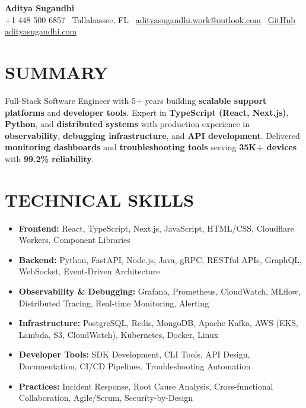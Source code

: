 \documentclass[letterpaper,10pt]{article}
\newcommand{\resumeItem}[1]{\item\small #1}
\begin{document}
\begin{center}
{\huge\textbf{Aditya Sugandhi}} \\
+1 448 500 6857 \textbar\ \textcolor{metablue}{Tallahassee, FL} \textbar\
\href{mailto:adityasugandhi.work@outlook.com}{adityasugandhi.work@outlook.com} \textbar\
\href{https://github.com/adityasugandhi}{GitHub}
\textbar \href{https://adityasugandhi.com}{adityasugandhi.com}
\end{center}
\vspace{-12pt}

\section{\textcolor{metablue}{SUMMARY}}
\small
\vspace{-6pt}
Full-Stack Software Engineer with 5+ years building \textbf{scalable support platforms} and \textbf{developer tools}. Expert in \textbf{TypeScript (React, Next.js)}, \textbf{Python}, and \textbf{distributed systems} with production experience in \textbf{observability}, \textbf{debugging infrastructure}, and \textbf{API development}. Delivered \textbf{monitoring dashboards} and \textbf{troubleshooting tools} serving \textbf{35K+ devices} with \textbf{99.2\% reliability}.

\vspace{-9pt}

\section{\textcolor{metablue}{TECHNICAL SKILLS}}
\vspace{-5pt}
\small
\begin{itemize}
\resumeItem{\textbf{Frontend:} React, TypeScript, Next.js, JavaScript, HTML/CSS, Cloudflare Workers, Component Libraries}
\resumeItem{\textbf{Backend:} Python, FastAPI, Node.js, Java, gRPC, RESTful APIs, GraphQL, WebSocket, Event-Driven Architecture}
\resumeItem{\textbf{Observability \& Debugging:} Grafana, Prometheus, CloudWatch, MLflow, Distributed Tracing, Real-time Monitoring, Alerting}
\resumeItem{\textbf{Infrastructure:} PostgreSQL, Redis, MongoDB, Apache Kafka, AWS (EKS, Lambda, S3, CloudWatch), Kubernetes, Docker, Linux}
\resumeItem{\textbf{Developer Tools:} SDK Development, CLI Tools, API Design, Documentation, CI/CD Pipelines, Troubleshooting Automation}
\resumeItem{\textbf{Practices:} Incident Response, Root Cause Analysis, Cross-functional Collaboration, Agile/Scrum, Security-by-Design}
\end{itemize}
\vspace{-10pt}
\end{document}
